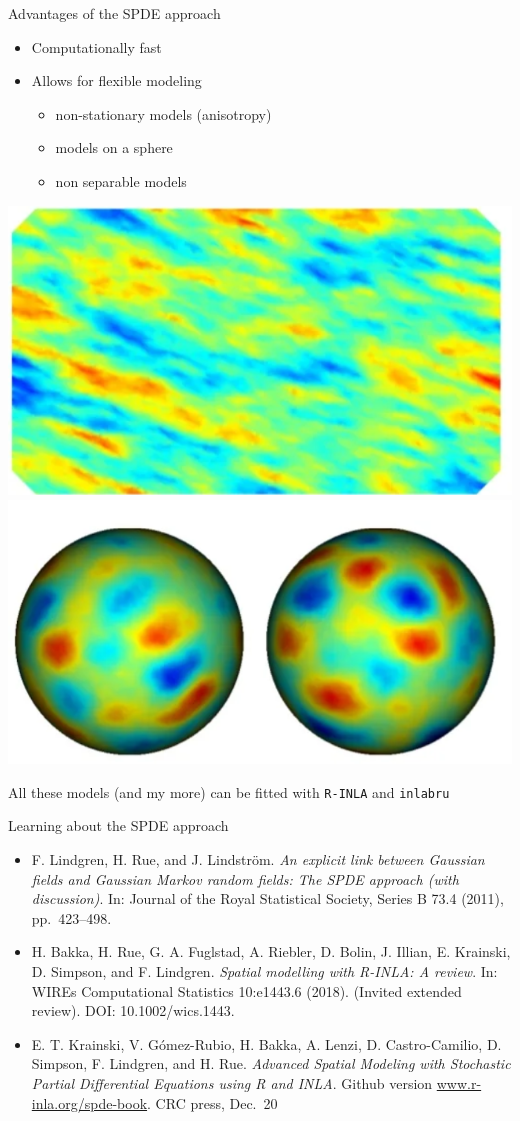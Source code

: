 \documentclass[
  ignorenonframetext,
]{beamer}
\begin{document}
\begin{frame}[fragile]{Advantages of the SPDE approach}
\protect\hypertarget{advantages-of-the-spde-approach}{}
\begin{itemize}
\item
  Computationally fast
\item
  Allows for flexible modeling

  \begin{itemize}
  \item
    non-stationary models (anisotropy)
  \item
    models on a sphere
  \item
    non separable models
  \end{itemize}
\end{itemize}

\begin{center}\includegraphics[width=0.29\linewidth,height=0.2\textheight]{graphics/fig1} \includegraphics[width=0.29\linewidth,height=0.2\textheight]{graphics/fig2} \end{center}

All these models (and my more) can be fitted with \texttt{R-INLA} and
\texttt{inlabru}
\end{frame}

\begin{frame}{Learning about the SPDE approach}
\protect\hypertarget{learning-about-the-spde-approach}{}
\begin{itemize}
\item
  F. Lindgren, H. Rue, and J. Lindström. \emph{An explicit link between
  Gaussian fields and Gaussian Markov random fields: The SPDE approach
  (with discussion)}. In: Journal of the Royal Statistical Society,
  Series B 73.4 (2011), pp.~423--498.
\item
  H. Bakka, H. Rue, G. A. Fuglstad, A. Riebler, D. Bolin, J. Illian, E.
  Krainski, D. Simpson, and F. Lindgren. \emph{Spatial modelling with
  R-INLA: A review}. In: WIREs Computational Statistics 10:e1443.6
  (2018). (Invited extended review). DOI: 10.1002/wics.1443.
\item
  E. T. Krainski, V. Gómez-Rubio, H. Bakka, A. Lenzi, D. Castro-Camilio,
  D. Simpson, F. Lindgren, and H. Rue. \emph{Advanced Spatial Modeling
  with Stochastic Partial Differential Equations using R and INLA}.
  Github version \url{www.r-inla.org/spde-book}. CRC press, Dec.~20
\end{itemize}
\end{frame}
\end{document}
